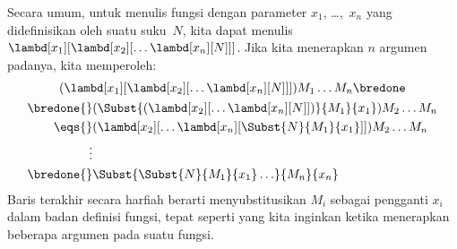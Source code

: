 \documentclass[../../../include/open-logic-section]{subfiles}
\begin{document}
Secara umum, untuk menulis fungsi dengan parameter $x_1$, \dots,~$x_n$ yang
didefinisikan oleh suatu suku~$N$, kita dapat menulis
$\lambd[x_1][\lambd[x_2][\ldots\lambd[x_n][N]]]$. Jika kita menerapkan $n$
argumen padanya, kita memperoleh:
\begin{multline*}
  (\lambd[x_1][\lambd[x_2][\ldots\lambd[x_n][N]]]) M_1 \dots M_n \bredone\\
  \begin{aligned}
  \bredone {} & (\Subst{(\lambd[x_2][\ldots\lambd[x_n][N]])}{M_1}{x_1}) M_2
  \dots M_n\\
   \eqs {} & (\lambd[x_2][\ldots\lambd[x_n][\Subst{N}{M_1}{x_1}]]) M_2
            \dots M_n \\
  \vdots & \\
  \bredone {} &\Subst{\Subst{N}{M_1}{x_1}\ldots}{M_n}{x_n}
  \end{aligned}
\end{multline*}
Baris terakhir secara harfiah berarti menyubstitusikan $M_i$ sebagai pengganti
$x_i$ dalam badan definisi fungsi, tepat seperti yang kita inginkan ketika
menerapkan beberapa argumen pada suatu fungsi.
\end{document}
